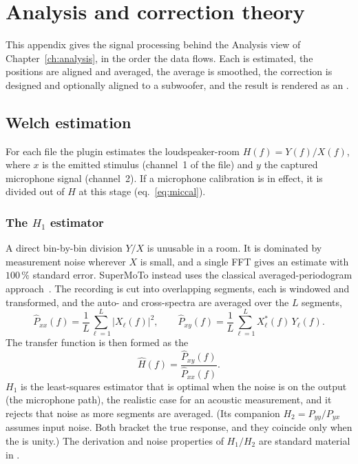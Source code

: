 \chapter{Analysis and correction theory}\label{ch:anatheory}

This appendix gives the signal processing behind the Analysis view of Chapter~\ref{ch:analysis}, in the order the data flows. Each  is estimated, the positions are aligned and averaged, the average is smoothed, the correction is designed and optionally aligned to a subwoofer, and the result is rendered as an .

\section{Welch estimation}\label{sec:thwelch}
For each file the plugin estimates the loudspeaker-room  $H(f)=Y(f)/X(f)$, where $x$ is the emitted stimulus (channel~1 of the file) and $y$ the captured microphone signal (channel~2). If a microphone calibration is in effect, it is divided out of $H$ at this stage (eq.~\eqref{eq:miccal}).

\subsection{The $H_1$ estimator}
A direct bin-by-bin division $Y/X$ is unusable in a room. It is dominated by measurement noise wherever $X$ is small, and a single FFT gives an estimate with $100\,\%$ standard error. SuperMoTo instead uses the classical  averaged-periodogram approach~\cite{Welch1967}. The recording is cut into overlapping segments, each is windowed and transformed, and the auto- and cross-spectra are averaged over the $L$ segments,
\begin{equation}
  \hat P_{xx}(f) = \frac{1}{L}\sum_{\ell=1}^{L} |X_\ell(f)|^2,
  \qquad
  \hat P_{xy}(f) = \frac{1}{L}\sum_{\ell=1}^{L} X_\ell^{*}(f)\,Y_\ell(f).
\end{equation}
The transfer function is then formed as the 
\begin{equation}
  \hat H(f) = \frac{\hat P_{xy}(f)}{\hat P_{xx}(f)} .
  \label{eq:h1}
\end{equation}
$H_1$ is the least-squares estimator that is optimal when the noise is on the output (the microphone path), the realistic case for an acoustic measurement, and it rejects that noise as more segments are averaged. (Its companion $H_2=P_{yy}/P_{yx}$ assumes input noise. Both bracket the true response, and they coincide only when the  is unity.) The derivation and noise properties of $H_1/H_2$ are standard material in \cite{BendatPiersol,ShinHammond,OppenheimSchafer}.


